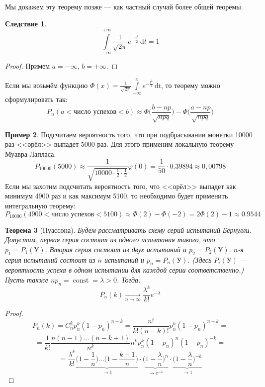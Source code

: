\documentclass[11pt,openany,a4paper]{scrartcl}
\theoremstyle{plain}
\newtheorem{theorem}{Теорема}[subsection]
\newtheorem{corollary}[theorem]{Следствие}
\theoremstyle{definition}
\newtheorem{example}[theorem]{Пример}
\newcommand{\underto}[1]{\xrightarrow[#1]{}}
\newcommand{\dif}{\, \mathrm d}
\DeclareMathOperator{\const}{const}
\begin{document}
Мы докажем эту теорему позже — как частный случай более общей теоремы.

\begin{corollary}
    $$
    \int\limits_{-\infty}^{+\infty}
    \frac{1}{\sqrt{2\pi}}e^{-\frac{t^2}{2}}\dif t = 1
    $$
\end{corollary}
\begin{proof}
    Примем $a = -\infty$, $b = +\infty$.
\end{proof}

Если мы возьмём функцию $\Phi(x) = \frac{1}{\sqrt{2\pi}}\int\limits_{-\infty}^x
e^{-\frac{t^2}{2}}\dif t$,
то теорему можно сформулировать так:
$$
P_n(a < \text{число успехов} < b) \approx
\Phi\bigg(\frac{b-np}{\sqrt{npq}}\bigg) -
\Phi\bigg(\frac{a - np}{\sqrt{npq}}\bigg)
$$

\begin{example}
    Подсчитаем вероятность того, что при подбрасывании монетки 10000 раз <<орёл>>
    выпадет 5000 раз. Для этого применим локальную теорему Муавра-Лапласа.
    $$
    P_{10000}(5000) \approx
    \frac{1}{\sqrt{10000 \cdot \frac{1}{2} \cdot \frac{1}{2}}}\varphi(0) =
    \frac{1}{50} \cdot 0.39894 \approx 0,00798
    $$
    Если мы захотим подсчитать вероятность того, что <<орёл>> выпадет как минимум 
    4900 раз и как максимум 5100, то необходимо будет применить интегральную
    теорему:
    $$
    P_{10000}(4900 < \text{число успехов} < 5100) \approx \Phi(2) - \Phi(-2) = 
    2\Phi(2) - 1 \approx 0.9544
    $$
\end{example}

\begin{theorem}[Пуассона]
    Будем рассматривать схему серий испытаний Бернулли. Допустим, первая серия 
    состоит из одного испытания такого, что $p_1 = P_1(У)$. Вторая серия
    состоит из двух испытаний и $p_2 = P_2(У)$.
    $n$-я серия испытаний состоит из $n$ испытаний и $p_n = P_n(У)$.
    (Здесь $P_i(У)$ — вероятность успеха в одном испытании для каждой серии 
    соответственно.)
    Пусть также $np_n = \const = \lambda > 0$. Тогда:
    $$
    P_n(k) \underto{n \to \infty} \frac{\lambda^k}{k!}e^{-\lambda}
    $$
\end{theorem}
\begin{proof}
    $$
    P_n(k) = C_n^k p_n^k(1 - p_n)^{n-k} = \frac{n!}{k!(n-k)!}p_n^k(1-p_n)^{n-k} =
    $$
    $$
    = \frac{1}{k!} \frac{n(n-1)\ldots(n-k+1)}{n^k} n^k
    p_n^k(1-p_n)^n(1-p_n)^{-k} =
    $$
    $$
    = \frac{\lambda^k}{k!}
    \underbrace{\bigg(1 - \frac{1}{n}\bigg)\ldots\bigg(1 - \frac{k-1}{n}\bigg)}_{\to 1} \cdot
    \underbrace{\bigg(1 - \frac{\lambda}{n}\bigg)^n}_{\to e^{-\lambda}}\cdot
    \underbrace{\bigg(1 - \frac{\lambda}{n}\bigg)^{-k}}_{\to 1}    
    $$
\end{proof}
\end{document}
